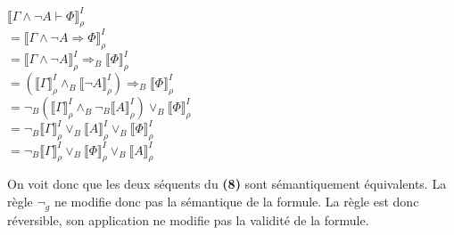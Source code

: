 \documentclass[11pt,letterpaper]{article}
\begin{document}
$\llbracket \Gamma \land \neg A \vdash \Phi \rrbracket^{I}_ {\rho}$\\
$= \llbracket \Gamma \land \neg  A \Rightarrow  \Phi \rrbracket^{I}_ {\rho}$\\
$= \llbracket \Gamma \land \neg  A\rrbracket^{I}_ {\rho} \Rightarrow_{B} \llbracket \Phi \rrbracket^{I}_ {\rho}$\\
$= (\llbracket \Gamma \rrbracket^{I}_ {\rho}\land_{B} \llbracket \neg A \rrbracket^{I}_ {\rho}) \Rightarrow_{B}  \llbracket\Phi \rrbracket^{I}_ {\rho}$\\
$=  \neg_{B}(\llbracket \Gamma \rrbracket^{I}_ {\rho} \land_{B} \neg_{B} \llbracket A \rrbracket^{I}_ {\rho}) \lor_{B} \llbracket\Phi \rrbracket^{I}_ {\rho}$\\
$= \neg_{B} \llbracket \Gamma \rrbracket^{I}_ {\rho} \lor_{B} \llbracket A \rrbracket^{I}_ {\rho} \lor_{B} \llbracket\Phi \rrbracket^{I}_ {\rho}$\\
$= \neg_{B} \llbracket \Gamma \rrbracket^{I}_ {\rho} \lor_{B} \llbracket\Phi \rrbracket^{I}_ {\rho} \lor_{B} \llbracket A \rrbracket^{I}_ {\rho}$\\
\vspace{10px}

On voit donc que les deux séquents du \textbf{(8)} sont sémantiquement équivalents. La règle $\neg_{g}$ ne modifie donc pas la sémantique de la formule. La règle est donc réversible, son application ne modifie pas la validité de la formule. \\
\end{document}
